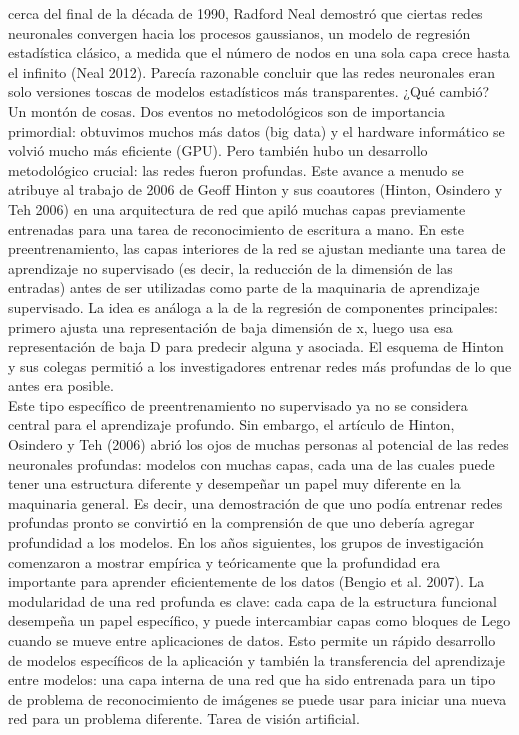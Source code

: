 cerca del final de la década de 1990, Radford Neal demostró que ciertas redes neuronales convergen hacia los procesos gaussianos, un modelo de regresión estadística clásico, a medida que el número de nodos en una sola capa crece hasta el infinito (Neal 2012). Parecía razonable concluir que las redes neuronales eran solo versiones toscas de modelos estadísticos más transparentes. ¿Qué cambió? Un montón de cosas. Dos eventos no metodológicos son de importancia primordial: obtuvimos muchos más datos (big data) y el hardware informático se volvió mucho más eficiente (GPU). Pero también hubo un desarrollo metodológico crucial: las redes fueron profundas. Este avance a menudo se atribuye al trabajo de 2006 de Geoff Hinton y sus coautores (Hinton, Osindero y Teh 2006) en una arquitectura de red que apiló muchas capas previamente entrenadas para una tarea de reconocimiento de escritura a mano. En este preentrenamiento, las capas interiores de la red se ajustan mediante una tarea de aprendizaje no supervisado (es decir, la reducción de la dimensión de las entradas) antes de ser utilizadas como parte de la maquinaria de aprendizaje supervisado. La idea es análoga a la de la regresión de componentes principales: primero ajusta una representación de baja dimensión de x, luego usa esa representación de baja D para predecir alguna y asociada. El esquema de Hinton y sus colegas permitió a los investigadores entrenar redes más profundas de lo que antes era posible.\\
Este tipo específico de preentrenamiento no supervisado ya no se considera central para el aprendizaje profundo. Sin embargo, el artículo de Hinton, Osindero y Teh (2006) abrió los ojos de muchas personas al potencial de las redes neuronales profundas: modelos con muchas capas, cada una de las cuales puede tener una estructura diferente y desempeñar un papel muy diferente en la maquinaria general. Es decir, una demostración de que uno podía entrenar redes profundas pronto se convirtió en la comprensión de que uno debería agregar profundidad a los modelos. En los años siguientes, los grupos de investigación comenzaron a mostrar empírica y teóricamente que la profundidad era importante para aprender eficientemente de los datos (Bengio et al. 2007). La modularidad de una red profunda es clave: cada capa de la estructura funcional desempeña un papel específico, y puede intercambiar capas como bloques de Lego cuando se mueve entre aplicaciones de datos. Esto permite un rápido desarrollo de modelos específicos de la aplicación y también la transferencia del aprendizaje entre modelos: una capa interna de una red que ha sido entrenada para un tipo de problema de reconocimiento de imágenes se puede usar para iniciar una nueva red para un problema diferente. Tarea de visión artificial.\\
